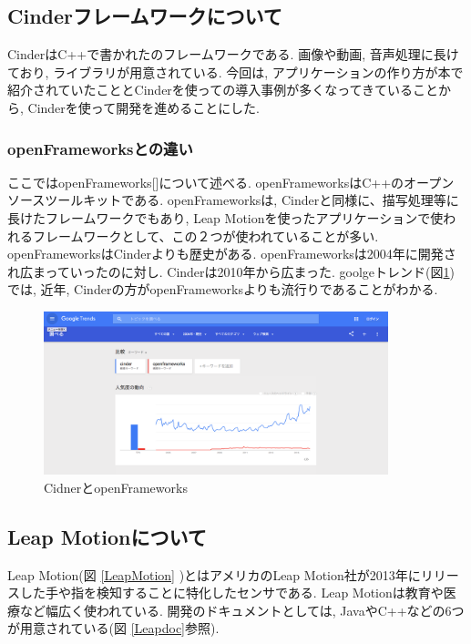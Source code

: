 \documentclass{funthesis}
\begin{document}
\subsection{Cinderフレームワークについて}
CinderはC++で書かれたのフレームワークである. 画像や動画, 音声処理に長けており, ライブラリが用意されている. 今回は, アプリケーションの作り方が本で紹介されていたこととCinderを使っての導入事例が多くなってきていることから, Cinderを使って開発を進めることにした. 



\subsubsection{openFrameworksとの違い}
ここではopenFrameworks[]について述べる. openFrameworksはC++のオープンソースツールキットである. openFrameworksは, Cinderと同様に、描写処理等に長けたフレームワークでもあり, Leap Motionを使ったアプリケーションで使われるフレームワークとして、この２つが使われていることが多い. 
openFrameworksはCinderよりも歴史がある. openFrameworksは2004年に開発され広まっていったのに対し. Cinderは2010年から広まった. goolgeトレンド(図\ref{API})では, 近年, Cinderの方がopenFrameworksよりも流行りであることがわかる. 

\begin{figure}[H]
 \begin{center}
  \includegraphics[width=100mm]{./img/api.png}
 \end{center}
 \caption{CidnerとopenFrameworks}
 \label{API}
\end{figure}


\subsection{Leap Motionについて}
Leap Motion(図 \ref{LeapMotion} )とはアメリカのLeap Motion社が2013年にリリースした手や指を検知することに特化したセンサである. Leap Motionは教育や医療など幅広く使われている. 開発のドキュメントとしては, JavaやC++などの6つが用意されている(図 \ref{Leapdoc}参照).
\end{document}
